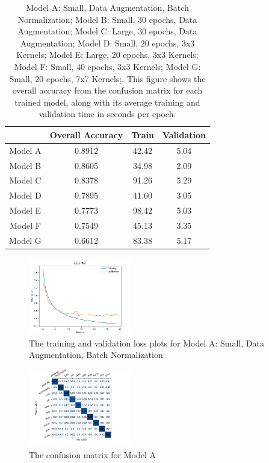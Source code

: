 \documentclass[11pt,a4paper]{article}
\begin{document}
 \begin{table}
    \centering
    \begin{tabular}{ |c|c|c|c| } 
     \hline
      & Overall Accuracy & Train & Validation \\
     \hline
     Model A & 0.8912 & 42.42 & 5.04 \\ 
     \hline
     Model B & 0.8605 & 34.98 & 2.09 \\ 
     \hline
     Model C & 0.8378 & 91.26 & 5.29 \\ 
     \hline
     Model D & 0.7895 & 41.60 & 3.05 \\ 
     \hline
     Model E & 0.7773 & 98.42 & 5.03 \\ 
     \hline
     Model F & 0.7549 & 45.13 & 3.35 \\ 
     \hline
     Model G & 0.6612 & 83.38 & 5.17 \\ 
     \hline
     
    
    \end{tabular}
    \caption{Model A: Small, Data Augmentation, Batch Normalization; Model B: Small, 30 epochs, Data Augmentation; Model C: Large, 30 epochs, Data Augmentation;
    Model D: Small, 20 epochs, 3x3 Kernels; Model E: Large, 20 epochs, 3x3 Kernels; 
    Model F: Small, 40 epochs, 3x3 Kernels; Model G: Small, 20 epochs, 7x7 Kernels;. This figure shows the overall accuracy from the confusion matrix 
    for each trained model, along with its average training and validation time in seconds per epoch.}
    \label{tab:table1}
\end{table}

\begin{figure}
  \centering
  \includegraphics[width=0.40\textwidth]{figures/plots.png}
  \caption{The training and validation loss plots for Model A: Small, Data Augmentation, Batch Normalization}
  \label{fig:plots}
\end{figure}

\begin{figure}
  \centering
  \includegraphics[width=0.40\textwidth]{figures/confusion.png}
  \caption{The confusion matrix for Model A}
  \label{fig:confusion}
\end{figure}
\end{document}

